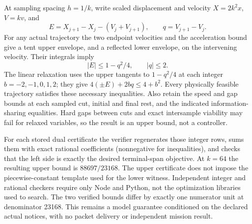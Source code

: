 \documentclass[11pt]{article}
\begin{document}
At sampling spacing \(h=1/k\), write scaled displacement and velocity
\(X=2k^2x\), \(V=kv\), and
\[
 E=X_{j+1}-X_j-(V_j+V_{j+1}), \qquad
 q=V_{j+1}-V_j .
\]
For any actual trajectory the two endpoint velocities and
the acceleration bound give a tent upper envelope, and a
reflected lower envelope, on the intervening velocity.
Their integrals imply
\[
                  |E|\le 1-q^2/4,\qquad |q|\le 2 .
\]
The linear relaxation uses the upper tangents to
\(1-q^2/4\) at each integer \(b=-2,-1,0,1,2\); they give
\(4(\pm E)+2bq\le 4+b^2\). Every physically feasible trajectory
satisfies these necessary inequalities. Also retain the
speed and gap bounds at each sampled cut, initial and final
rest, and the indicated information-sharing equalities.
Hard gaps between cuts and exact intersample viability may
fail for relaxed variables, so the result is an upper bound,
not a controller.

For each stored dual certificate the verifier regenerates
those integer rows, sums them with exact rational coefficients
(nonnegative for inequalities), and checks that the left
side is exactly the desired terminal-span objective.
At \(k=64\) the resulting upper bound is \(88697/23168\).
The upper certificate does not impose the piecewise-constant
template used for the lower witness. Independent integer and
rational checkers require only Node and Python, not the
optimization libraries used to search. The two verified
bounds differ by exactly one numerator unit at denominator
23168. This remains a model guarantee conditioned on the
declared actual notices, with no packet delivery or independent
mission result.
\end{document}
